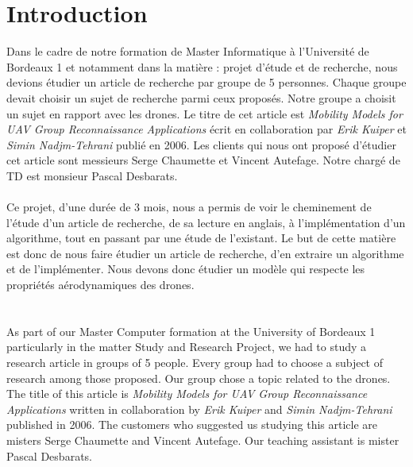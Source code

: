 \chapter*{Introduction}

Dans le cadre de notre formation de Master Informatique à l'Université de Bordeaux 1 et notamment dans la matière : projet d'étude et de recherche, nous devions étudier un article de recherche par groupe de 5 personnes. Chaque groupe devait choisir un sujet de recherche parmi ceux proposés. Notre groupe a choisit un sujet en rapport avec les drones. Le titre de cet article est \textit{Mobility Models for UAV Group Reconnaissance Applications} écrit en collaboration par \textit{Erik Kuiper} et \textit{Simin Nadjm-Tehrani} publié en 2006. Les clients qui nous ont proposé d'étudier cet article sont messieurs Serge Chaumette et Vincent Autefage. Notre chargé de TD est monsieur Pascal Desbarats.
\\\\
Ce projet, d'une durée de 3 mois, nous a permis de voir le cheminement de l'étude d'un article de recherche, de sa lecture en anglais, à l'implémentation d'un algorithme, tout en passant par une étude de l'existant.
Le but de cette matière est donc de nous faire étudier un article de recherche, d'en extraire un algorithme et de l'implémenter. Nous devons donc étudier un modèle qui respecte les propriétés aérodynamiques des drones.\\
\\\\
As part of our Master Computer formation at the University of Bordeaux 1 particularly in the matter Study and Research Project, we had to study a research article in groups of 5 people. Every group had to choose a subject of research among those proposed. Our group chose a topic related to the drones. The title of this article is \textit{Mobility Models for UAV Group Reconnaissance Applications} written in collaboration by \textit{Erik Kuiper} and \textit{Simin Nadjm-Tehrani} published in 2006. The customers who suggested us studying this article are misters Serge Chaumette and Vincent Autefage. Our teaching assistant is mister Pascal Desbarats.
\\\\

